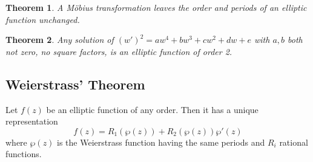 \documentclass[10pt, oneside, reqno]{amsart}
\theoremstyle{plain}%
\newtheorem{thm}{Theorem}[section]
\theoremstyle{definition}
\theoremstyle{remark}
\begin{document}
\begin{thm}
    A M\"obius transformation leaves the order and periods of an elliptic function unchanged.  
\end{thm}
\begin{thm}
    Any solution of $(w')^2 = aw^4 + bw^3 + cw^2 +dw + e$ with $a,b$ both not zero, no square factors, is an elliptic function of order 2.
\end{thm}

\subsection{Weierstrass' Theorem} %
\label{sub:weierstrass_theorem}
    Let $f(z)$ be an elliptic function of any order.  Then it has a unique representation \[
        f(z) = R_1(\wp(z)) + R_2(\wp(z)) \wp'(z)
    \] where $\wp(z)$ is the Weierstrass function having the same periods and $R_i$ rational functions.  



\end{document}
